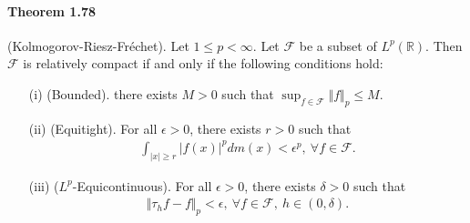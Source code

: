\documentclass{article}
\begin{document}
\paragraph{Theorem 1.78\label{thm:1.78}} (Kolmogorov-Riesz-Fréchet). Let $1\leq p < \infty$. Let $\mathcal{F}$ be a subset of $L^p(\mathbb{R})$. Then $\mathcal{F}$ is relatively compact if and only if the following conditions hold:
\begin{itemize}
	\item[(i)] (Bounded). there exists $M>0$ such that $\sup_{f\in\mathcal{F}}\Vert f\Vert_p \leq M$.
	\item[(ii)] (Equitight). For all $\epsilon>0$, there exists $r>0$ such that
	\begin{align*}
		\int_{\vert x\vert \geq r}\vert f(x)\vert^p dm(x) < \epsilon^p,\ \forall f\in\mathcal{F}.
	\end{align*}
	\item[(iii)] ($L^p$-Equicontinuous). For all $\epsilon>0$, there exists $\delta>0$ such that
	\begin{align*}
		\Vert\tau_h f - f\Vert_p  < \epsilon,\ \forall f\in\mathcal{F},\ h\in(0,\delta).
	\end{align*}
\end{itemize}
\end{document}
